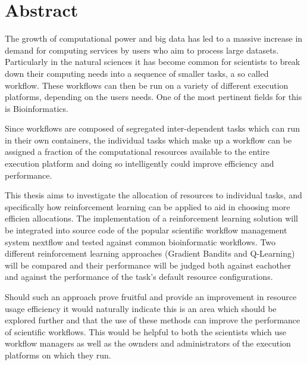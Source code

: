 
\cleardoublepage
{}
\section*{Abstract}

The growth of computational power and big data has led to a massive increase in demand for computing services by users who aim to process large datasets. Particularly in the natural sciences it has become common for scientists to break down their computing needs into a sequence of smaller tasks, a so called workflow. These workflows can then be run on a variety of different execution platforms, depending on the users needs.  One of the most pertinent fields for this is Bioinformatics.

Since workflows are composed of segregated inter-dependent tasks which can run in their own containers, the individual tasks which make up a workflow can be assigned a fraction of the computational resources available to the entire execution platform and doing so intelligently could improve efficiency and performance.

This thesis aims to investigate the allocation of resources to individual tasks, and specifically how reinforcement learning can be applied to aid in choosing more efficien allocations. The implementation of a reinforcement learning solution will be integrated into source code  of the popular scientific workflow management system nextflow and tested against common bioinformatic workflows. Two different reinforcement learning approaches (Gradient Bandits and Q-Learning) will be compared and their performance will be judged both against eachother and against the performance of the task's default resource configurations.

Should such an approach prove fruitful and provide an improvement in resource usage efficiency it would naturally indicate this is an area which should be explored further and that the use of these methods can improve the performance of scientific workflows. This would be helpful to both the scientists which use workflow managers as well as the ownders and administrators of the execution platforms on which they run.



